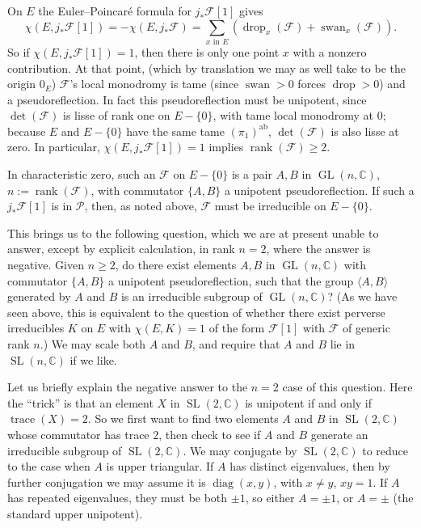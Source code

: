 On \(E\) the Euler--Poincaré formula for \(j_*\mathcal{F}[1]\) gives
\[
  \chi(E,j_*\mathcal{F}[1])
  =
  -\chi(E,j_*\mathcal{F})
  =
  \sum_{x\text{ in }E}(\operatorname{drop}_x(\mathcal{F})
  +\operatorname{swan}_x(\mathcal{F})).
\]
So if \(\chi(E,j_*\mathcal{F}[1])=1\), then there is only one point \(x\) with
a nonzero contribution. At that point, (which by translation we may as well
take to be the origin \(0_E\)) \(\mathcal{F}\)'s local monodromy is tame
(since \(\operatorname{swan}>0\) forces \(\operatorname{drop}>0\)) and a
pseudoreflection. In fact this pseudoreflection must be unipotent, since
\(\det(\mathcal{F})\) is lisse of rank one on \(E-\{0\}\), with tame local
monodromy at \(0\); because \(E\) and \(E-\{0\}\) have the same tame
\((\pi_1)^{\mathrm{ab}}\), \(\det(\mathcal{F})\) is also lisse at zero. In
particular, \(\chi(E,j_*\mathcal{F}[1])=1\) implies
\(\operatorname{rank}(\mathcal{F})\geq2\).

In characteristic zero, such an \(\mathcal{F}\) on \(E-\{0\}\) is a pair
\(A,B\) in \(\operatorname{GL}(n,\mathbb{C})\),
\(n:=\operatorname{rank}(\mathcal{F})\), with commutator \(\{A,B\}\) a
unipotent pseudoreflection. If such a \(j_*\mathcal{F}[1]\) is in
\(\mathcal{P}\), then, as noted above, \(\mathcal{F}\) must be irreducible on
\(E-\{0\}\).

This brings us to the following question, which we are at present unable to
answer, except by explicit calculation, in rank \(n=2\), where the answer is
negative. Given \(n\geq2\), do there exist elements \(A,B\) in
\(\operatorname{GL}(n,\mathbb{C})\) with commutator \(\{A,B\}\) a unipotent
pseudoreflection, such that the group \(\langle A,B\rangle\) generated by
\(A\) and \(B\) is an irreducible subgroup of
\(\operatorname{GL}(n,\mathbb{C})\)? (As we have seen above, this is
equivalent to the question of whether there exist perverse irreducibles \(K\)
on \(E\) with \(\chi(E,K)=1\) of the form \(\mathcal{F}[1]\) with
\(\mathcal{F}\) of generic rank \(n\).) We may scale both \(A\) and \(B\), and
require that \(A\) and \(B\) lie in \(\operatorname{SL}(n,\mathbb{C})\) if we
like.

Let us briefly explain the negative answer to the \(n=2\) case of this
question. Here the ``trick'' is that an element \(X\) in
\(\operatorname{SL}(2,\mathbb{C})\) is unipotent if and only if
\(\operatorname{trace}(X)=2\). So we first want to find two elements \(A\) and
\(B\) in \(\operatorname{SL}(2,\mathbb{C})\) whose commutator has trace \(2\),
then check to see if \(A\) and \(B\) generate an irreducible subgroup of
\(\operatorname{SL}(2,\mathbb{C})\). We may conjugate by
\(\operatorname{SL}(2,\mathbb{C})\) to reduce to the case when \(A\) is upper
triangular. If \(A\) has distinct eigenvalues, then by further conjugation we
may assume it is \(\operatorname{diag}(x,y)\), with \(x\ne y\), \(xy=1\). If
\(A\) has repeated eigenvalues, they must be both \(\pm1\), so either
\(A=\pm1\), or \(A=\pm\) (the standard upper unipotent).

